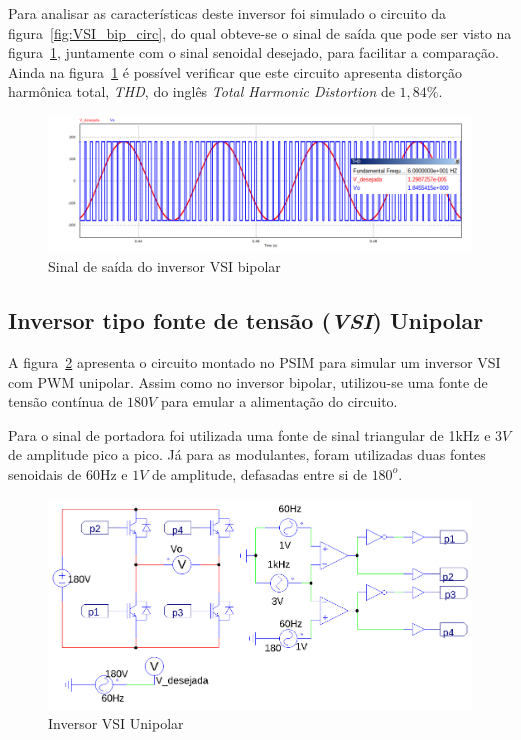 \documentclass[
	12pt,				%
	openany,
	onseside,
	a4paper,			%
	english,			%
	french,				%
	spanish,			%
	brazil,				%
	]{abntex2}
\begin{document}
Para analisar as características deste inversor foi simulado o circuito da figura~\ref{fig:VSI_bip_circ}, do qual obteve-se o sinal de saída que pode ser visto na figura~\ref{fig:response_vsi_bip}, juntamente com o sinal senoidal desejado, para facilitar a comparação. Ainda na figura~\ref{fig:response_vsi_bip} é possível verificar que este circuito apresenta distorção harmônica total, \emph{THD}, do inglês \textit{Total Harmonic Distortion} de $1,84\%$.

\begin{figure}[htbp]%
	\centering
		\includegraphics[width= \linewidth]{vsi_bip_out}
		\caption{Sinal de saída do inversor VSI bipolar}
		\label{fig:response_vsi_bip}
\end{figure}

\subsection{Inversor tipo fonte de tensão (\textit{VSI}) Unipolar}

A figura~\ref{fig:VSI_uni_circ} apresenta o circuito montado no PSIM para simular um inversor VSI com PWM unipolar. Assim como no inversor bipolar, utilizou-se uma fonte de tensão contínua de $180V$ para emular a alimentação do circuito.

Para o sinal de portadora foi utilizada uma fonte de sinal triangular de 1kHz e $3V$ de amplitude pico a pico. Já para as modulantes, foram utilizadas duas fontes senoidais de 60Hz e $1V$ de amplitude, defasadas entre si de $180^o$.

\begin{figure}[H]%
	\centering%
		\includegraphics[width=0.85 \linewidth]{vsi_unipolar_psim_circ}
		\caption{Inversor VSI Unipolar}
		\label{fig:VSI_uni_circ}
\end{figure}
\end{document}
